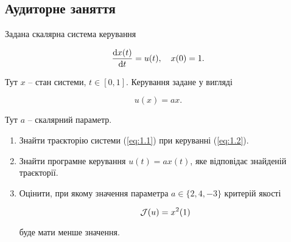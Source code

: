 \subsection{Аудиторне заняття}

\begin{problem}
	Задана скалярна система керування 
	
	\begin{equation}
		\label{eq:1.1}
		\frac{\mathop{}\!\mathrm{d} x(t)}{\mathop{}\!\mathrm{d} t} = u(t), \quad x(0) = 1.
	\end{equation}

	Тут $x$ -- стан системи, $t \in [0, 1]$. Керування задане у вигляді

	\begin{equation}
		\label{eq:1.2}
		u(x) = a x.
	\end{equation}

	Тут $a$ -- скалярний параметр.

	\begin{enumerate}
		\item Знайти траєкторію системи (\ref{eq:1.1}) при керуванні (\ref{eq:1.2}).

		\item Знайти програмне керування $u(t) = a x (t)$, яке відповідає знайденій траєкторії. 

		\item Оцінити, при якому значення параметра $a \in \{2, 4, -3\}$ критерій якості 

		\[ \mathcal{J}(u) = x^2 (1) \]

		буде мати менше значення.
	\end{enumerate}
\end{problem}

